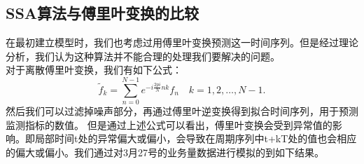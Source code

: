 \documentclass[a4paper]{article}
\begin{document}
\subsection{SSA算法与傅里叶变换的比较}
\indent 在最初建立模型时，我们也考虑过用傅里叶变换预测这一时间序列。但是经过理论分析，我们认为这种算法并不能合理的处理我们要解决的问题。\\
\indent 对于离散傅里叶变换，我们有如下公式：
\begin{equation}
\tilde f_k=\sum_{n=0}^{N-1}e^{-i\frac{2pi}{N}nk}f_n  \quad k=1,2,\dots,N-1.
\end{equation}
然后我们可以过滤掉噪声部分，再通过傅里叶逆变换得到拟合时间序列，用于预测监测指标的数值。
但是通过上述公式可以看出，傅里叶变换会受到异常值的影响。即局部时间t处的异常偏大或偏小，会导致在周期序列中t+kT处的值也会相应的偏大或偏小。我们通过对3月27号的业务量数据进行模拟的到如下结果。
\end{document}
